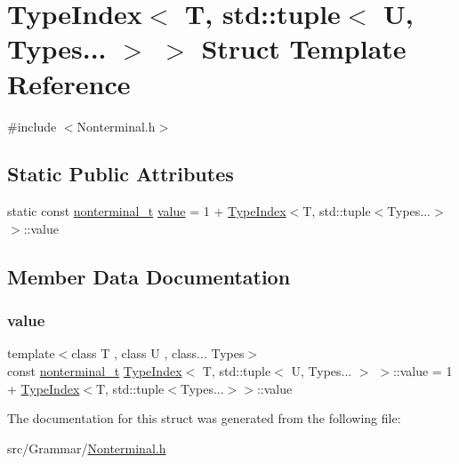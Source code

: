 \hypertarget{struct_type_index_3_01_t_00_01std_1_1tuple_3_01_u_00_01_types_8_8_8_01_4_01_4}{}\section{Type\+Index$<$ T, std\+:\+:tuple$<$ U, Types... $>$ $>$ Struct Template Reference}
\label{struct_type_index_3_01_t_00_01std_1_1tuple_3_01_u_00_01_types_8_8_8_01_4_01_4}


{\ttfamily \#include $<$Nonterminal.\+h$>$}

\subsection*{Static Public Attributes}
\begin{DoxyCompactItemize}
\item 
static const \hyperlink{_nonterminal_8h_a1c5bfe9b903f69c83bbde5da7035fef3}{nonterminal\+\_\+t} \hyperlink{struct_type_index_3_01_t_00_01std_1_1tuple_3_01_u_00_01_types_8_8_8_01_4_01_4_a87bb4c7885986ec91881b421ad1758b7}{value} = 1 + \hyperlink{struct_type_index}{Type\+Index}$<$T, std\+::tuple$<$Types...$>$$>$\+::value
\end{DoxyCompactItemize}


\subsection{Member Data Documentation}
\mbox{\label{struct_type_index_3_01_t_00_01std_1_1tuple_3_01_u_00_01_types_8_8_8_01_4_01_4_a87bb4c7885986ec91881b421ad1758b7}} 
\subsubsection{\texorpdfstring{value}{value}}
{\footnotesize\ttfamily template$<$class T , class U , class... Types$>$ \\
const \hyperlink{_nonterminal_8h_a1c5bfe9b903f69c83bbde5da7035fef3}{nonterminal\+\_\+t} \hyperlink{struct_type_index}{Type\+Index}$<$ T, std\+::tuple$<$ U, Types... $>$ $>$\+::value = 1 + \hyperlink{struct_type_index}{Type\+Index}$<$T, std\+::tuple$<$Types...$>$$>$\+::value\hspace{0.3cm}{\ttfamily [static]}}



The documentation for this struct was generated from the following file\+:\begin{DoxyCompactItemize}
\item 
src/\+Grammar/\hyperlink{_nonterminal_8h}{Nonterminal.\+h}\end{DoxyCompactItemize}
